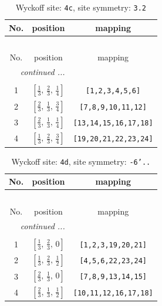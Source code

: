 \documentclass[fleqn,8pt]{jsarticle}
\begin{document}
\renewcommand{\arraystretch}{1.2}
\begin{longtable}{ccc}
\caption{Wyckoff site: {\tt 4c}, site symmetry: {\tt 3.2}}
 \\
 \hline \hline
No. & position & mapping \\ \hline \endfirsthead

\multicolumn{2}{l}{\tablename\ \thetable{}} \\
 \hline \hline
No. & position & mapping \\ \hline \endhead

 \hline \hline
\multicolumn{2}{r}{\footnotesize\it continued ...} \\ \endfoot

 \hline \hline
\multicolumn{2}{r}{} \\ \endlastfoot

1 & $\left[ \frac{1}{3},\, \frac{2}{3},\, \frac{1}{4} \right]$ & {\tt [1,2,3,4,5,6]} \\ \hline
2 & $\left[ \frac{2}{3},\, \frac{1}{3},\, \frac{3}{4} \right]$ & {\tt [7,8,9,10,11,12]} \\ \hline
3 & $\left[ \frac{2}{3},\, \frac{1}{3},\, \frac{1}{4} \right]$ & {\tt [13,14,15,16,17,18]} \\ \hline
4 & $\left[ \frac{1}{3},\, \frac{2}{3},\, \frac{3}{4} \right]$ & {\tt [19,20,21,22,23,24]} \\
\end{longtable}
\renewcommand{\arraystretch}{1.2}
\begin{longtable}{ccc}
\caption{Wyckoff site: {\tt 4d}, site symmetry: {\tt -6'..}}
 \\
 \hline \hline
No. & position & mapping \\ \hline \endfirsthead

\multicolumn{2}{l}{\tablename\ \thetable{}} \\
 \hline \hline
No. & position & mapping \\ \hline \endhead

 \hline \hline
\multicolumn{2}{r}{\footnotesize\it continued ...} \\ \endfoot

 \hline \hline
\multicolumn{2}{r}{} \\ \endlastfoot

1 & $\left[ \frac{1}{3},\, \frac{2}{3},\, 0 \right]$ & {\tt [1,2,3,19,20,21]} \\ \hline
2 & $\left[ \frac{1}{3},\, \frac{2}{3},\, \frac{1}{2} \right]$ & {\tt [4,5,6,22,23,24]} \\ \hline
3 & $\left[ \frac{2}{3},\, \frac{1}{3},\, 0 \right]$ & {\tt [7,8,9,13,14,15]} \\ \hline
4 & $\left[ \frac{2}{3},\, \frac{1}{3},\, \frac{1}{2} \right]$ & {\tt [10,11,12,16,17,18]} \\
\end{longtable}
\end{document}
